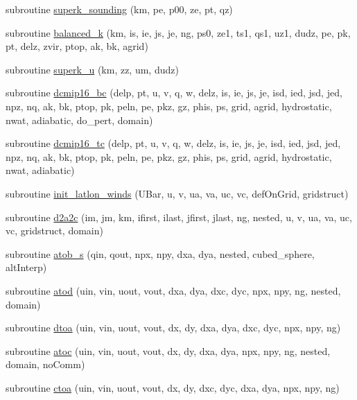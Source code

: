 \begin{DoxyCompactItemize}
\item 
subroutine \hyperlink{classtest__cases__mod_ad901175e50a8ade7ce8a2958b8d870fa}{superk\-\_\-sounding} (km, pe, p00, ze, pt, qz)
\item 
subroutine \hyperlink{classtest__cases__mod_a78e9f9beeac09a3c4bf4eed68c6322bb}{balanced\-\_\-k} (km, is, ie, js, je, ng, ps0, ze1, ts1, qs1, uz1, dudz, pe, pk, pt, delz, zvir, ptop, ak, bk, agrid)
\item 
subroutine \hyperlink{classtest__cases__mod_a070e13147cdf7a9aac6f05d75d80f96c}{superk\-\_\-u} (km, zz, um, dudz)
\item 
subroutine \hyperlink{classtest__cases__mod_ab293a7f2a292363f96b322a4482026a2}{dcmip16\-\_\-bc} (delp, pt, u, v, q, w, delz, is, ie, js, je, isd, ied, jsd, jed, npz, nq, ak, bk, ptop, pk, peln, pe, pkz, gz, phis, ps, grid, agrid, hydrostatic, nwat, adiabatic, do\-\_\-pert, domain)
\item 
subroutine \hyperlink{classtest__cases__mod_aefbd0cb99937da877c79d0f3e62c9e43}{dcmip16\-\_\-tc} (delp, pt, u, v, q, w, delz, is, ie, js, je, isd, ied, jsd, jed, npz, nq, ak, bk, ptop, pk, peln, pe, pkz, gz, phis, ps, grid, agrid, hydrostatic, nwat, adiabatic)
\item 
subroutine \hyperlink{classtest__cases__mod_a601918eaae703bb73c760577d2a17f3d}{init\-\_\-latlon\-\_\-winds} (U\-Bar, u, v, ua, va, uc, vc, def\-On\-Grid, gridstruct)
\item 
subroutine \hyperlink{classtest__cases__mod_a7c096124b6a75e72c34fdac2ccc88175}{d2a2c} (im, jm, km, ifirst, ilast, jfirst, jlast, ng, nested, u, v, ua, va, uc, vc, gridstruct, domain)
\item 
subroutine \hyperlink{classtest__cases__mod_a86974fdb65c72b74dc0a7fd7d4c55177}{atob\-\_\-s} (qin, qout, npx, npy, dxa, dya, nested, cubed\-\_\-sphere, alt\-Interp)
\item 
subroutine \hyperlink{classtest__cases__mod_a100a065323a0186529544823efd13358}{atod} (uin, vin, uout, vout, dxa, dya, dxc, dyc, npx, npy, ng, nested, domain)
\item 
subroutine \hyperlink{classtest__cases__mod_a269a1a702b0397e16e799c6e7076ac55}{dtoa} (uin, vin, uout, vout, dx, dy, dxa, dya, dxc, dyc, npx, npy, ng)
\item 
subroutine \hyperlink{classtest__cases__mod_a935b3dcf79703f05fca13713ee73ab4b}{atoc} (uin, vin, uout, vout, dx, dy, dxa, dya, npx, npy, ng, nested, domain, no\-Comm)
\item 
subroutine \hyperlink{classtest__cases__mod_a22b0794674be0887303224187a4bdc9f}{ctoa} (uin, vin, uout, vout, dx, dy, dxc, dyc, dxa, dya, npx, npy, ng)

\end{DoxyCompactItemize}
